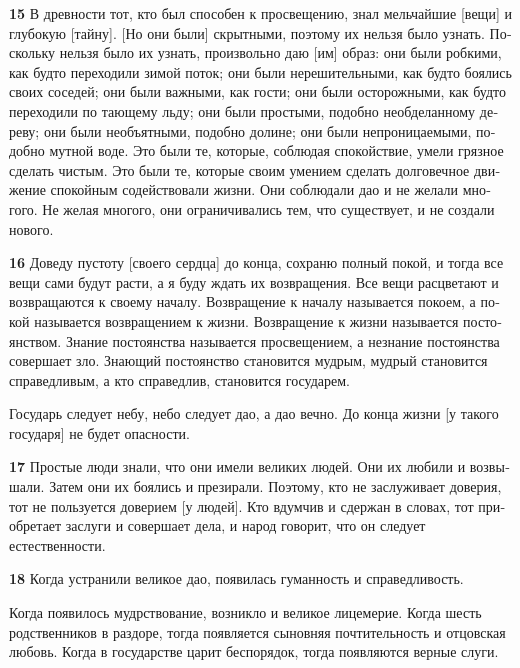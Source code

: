 \documentclass[a4paper]{article}
\begin{document}
{\ttfamily
\foreignlanguage{russian}{\textrm{\textbf{15}}}\foreignlanguage{russian}{\textrm{ В древности тот, кто был способен к
просвещению, знал мельчайшие [вещи] и глубокую [тайну]. [Но они были] скрытными, поэтому их нельзя было узнать.
Поскольку нельзя было их узнать, произвольно даю [им] образ: они были робкими, как будто переходили зимой поток; они
были нерешительными, как будто боялись своих соседей; они были важными, как гости; они были осторожными, как будто
переходили по тающему льду; они были простыми, подобно необделанному дереву; они были необъятными, подобно долине; они
были непроницаемыми, подобно мутной воде. Это были те, которые, соблюдая спокойствие, умели грязное сделать чистым. Это
были те, которые своим умением сделать долговечное движение спокойным содействовали жизни. Они соблюдали дао и не
желали многого. Не желая многого, они ограничивались тем, что существует, и не создали нового.}}}

{\ttfamily
\foreignlanguage{russian}{\textrm{\textbf{16}}}\foreignlanguage{russian}{\textrm{ Доведу пустоту [своего сердца] до
конца, сохраню полный покой, и тогда все вещи сами будут расти, а я буду ждать их возвращения. Все вещи расцветают и
возвращаются к своему началу. Возвращение к началу называется покоем, а покой называется возвращением к жизни.
Возвращение к жизни называется постоянством. Знание постоянства называется просвещением, а незнание постоянства
совершает зло. Знающий постоянство становится мудрым, мудрый становится справедливым, а кто справедлив, становится
государем.}}}

{
Государь следует небу, небо следует дао, а дао вечно. До конца жизни [у такого государя] не будет опасности.}

{\ttfamily
\foreignlanguage{russian}{\textrm{\textbf{17}}}\foreignlanguage{russian}{\textrm{ Простые люди знали, что они имели
великих людей. Они их любили и возвышали. Затем они их боялись и презирали. Поэтому, кто не заслуживает доверия, тот не
пользуется доверием [у людей]. Кто вдумчив и сдержан в словах, тот приобретает заслуги и совершает дела, и народ
говорит, что он следует естественности.}}}

{\ttfamily
\foreignlanguage{russian}{\textrm{\textbf{18}}}\foreignlanguage{russian}{\textrm{ Когда устранили великое дао, появилась
гуманность и справедливость.}}}

{
Когда появилось мудрствование, возникло и великое лицемерие. Когда шесть родственников в раздоре, тогда появляется
сыновняя почтительность и отцовская любовь. Когда в государстве царит беспорядок, тогда появляются верные слуги.}
\end{document}
